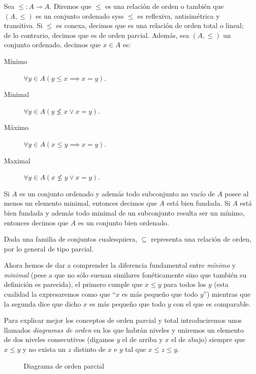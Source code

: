 \documentclass[11pt,a4paper]{book}
\begin{document}
\begin{mydef}
	Sea ${\leq}:A\multimap A$. Diremos que $\leq$ es una relación de orden o también que $(A,\leq)$ es un conjunto ordenado syss $\leq$ es reflexiva, antisimétrica y transitiva. Si $\leq$ es conexa, decimos que es una relación de orden total o lineal; de lo contrario, decimos que es de orden parcial. Además, sea $(A,\leq)$ un conjunto ordenado, decimos que $x\in A$ es:
	\begin{description}
		\item[Mínimo] $\forall y\in A(y\leq x\implies x=y)$.
		\item[Minimal] $\forall y\in A(y\not\leq x\vee x=y)$.
		\item[Máximo] $\forall y\in A(x\leq y\implies x=y)$.
		\item[Maximal] $\forall y\in A(x\not\leq y\vee x=y)$.
	\end{description}
	Si $A$ es un conjunto ordenado y además todo subconjunto no vacío de $A$ posee al menos un elemento minimal, entonces decimos que $A$ está bien fundada. Si $A$ está bien fundada y además todo minimal de un subconjunto resulta ser un mínimo, entonces decimos que $A$ es un conjunto bien ordenado.
\end{mydef}
Dada una familia de conjuntos cualesquiera, $\subseteq$ representa una relación de orden, por lo general de tipo parcial.

Ahora hemos de dar a comprender la diferencia fundamental entre \textit{mínimo} y \textit{minimal} (pese a que no sólo suenan similares fonéticamente sino que también su definición es parecida), el primero cumple que $x\leq y$ para todos los $y$ (esta cualidad la expresaremos como que ``$x$ es más pequeño que todo $y$'') mientras que la segunda dice que dicho $x$ es más pequeño que todo $y$ con el que es comparable.

Para explicar mejor los conceptos de orden parcial y total introduciremos unos llamados \textit{diagramas de orden} en los que habrán niveles y uniremos un elemento de dos niveles consecutivos (digamos $y$ el de arriba y $x$ el de abajo) siempre que $x\leq y$ y no exista un $z$ distinto de $x$ e $y$ tal que $x\leq z\leq y$.
\begin{figure}
	\centering
	\caption{Diagrama de orden parcial}\label{fig:partial-order-diagram}
\end{figure}
\end{document}
